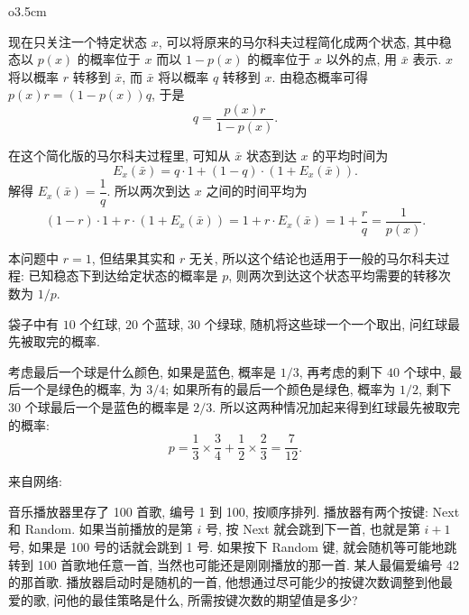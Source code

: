 \begin{wrapfigure}{o}{3.5cm}
\vspace{-1em}
\end{wrapfigure}
\mbox{}
现在只关注一个特定状态 $ x $, 可以将原来的马尔科夫过程简化成两个状态, 其中稳态以 $ p(x) $ 的概率位于 $ x $ 而以 $ 1 - p(x) $ 的概率位于 $ x $ 以外的点, 用 $ \bar{x} $ 表示. $ x $ 将以概率 $ r $ 转移到 $ \bar{x} $, 而 $ \bar{x} $ 将以概率 $ q $ 转移到 $ x $. 由稳态概率可得 $ p(x) r = (1-p(x))q $, 于是 
\[ q = \frac{p(x)r}{1-p(x)}. \]

在这个简化版的马尔科夫过程里, 可知从 $ \bar{x} $ 状态到达 $ x $ 的平均时间为 
\[ E_x(\bar{x}) = q\cdot 1 + (1-q)\cdot (1+E_x(\bar{x})). \]
解得 $ E_x(\bar{x}) = \dfrac{1}{q}.$ 所以两次到达 $ x $ 之间的时间平均为 
\[ (1-r)\cdot 1 + r\cdot (1+E_x(\bar{x})) = 1 + r\cdot E_x(\bar{x}) = 1 + \frac{r}{q} = \dfrac{1}{p(x)} .\]

本问题中 $ r = 1 $, 但结果其实和 $ r $ 无关, 所以这个结论也适用于一般的马尔科夫过程: 已知稳态下到达给定状态的概率是 $ p $, 则两次到达这个状态平均需要的转移次数为 $ 1/p $.

\newpage

袋子中有 $ 10 $ 个红球, $ 20 $ 个蓝球, $ 30 $ 个绿球, 随机将这些球一个一个取出, 问红球最先被取完的概率.

考虑最后一个球是什么颜色, 如果是蓝色, 概率是 $ 1/3 $, 再考虑的剩下 $ 40 $ 个球中, 最后一个是绿色的概率, 为 $ 3/4 $; 如果所有的最后一个颜色是绿色, 概率为 $ 1/2 $, 剩下 $ 30 $ 个球最后一个是蓝色的概率是 $ 2/3 $. 所以这两种情况加起来得到红球最先被取完的概率: 
\[ p = \frac{1}{3} \times \frac{3}{4} + \frac{1}{2} \times \frac{2}{3} = \frac{7}{12} .\]

\newpage
\noindent 来自网络: 

音乐播放器里存了 100 首歌, 编号 1 到 100, 按顺序排列. 播放器有两个按键: Next 和 Random. 如果当前播放的是第 $i$ 号, 按 Next 就会跳到下一首, 也就是第 $i+1$ 号, 如果是 100 号的话就会跳到 1 号. 如果按下 Random 键, 就会随机等可能地跳转到 100 首歌地任意一首, 当然也可能还是刚刚播放的那一首. 某人最偏爱编号 42 的那首歌. 播放器启动时是随机的一首, 他想通过尽可能少的按键次数调整到他最爱的歌, 问他的最佳策略是什么, 所需按键次数的期望值是多少?


